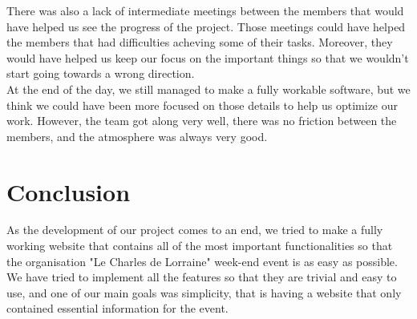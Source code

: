 \documentclass[a4paper, 12pt]{article}
\begin{document}
There was also a lack of intermediate meetings between the members that would have helped us see the progress of the project. Those meetings could have helped the members that had difficulties acheving some of their tasks. Moreover, they would have helped us keep our focus on the important things so that we wouldn't start going towards a wrong direction. \\

At the end of the day, we still managed to make a fully workable software, but we think we could have been more focused on those details to help us optimize our work. However, the team got along very well, there was no friction between the members, and the atmosphere was always very good.\\

\section{Conclusion}
As the development of our project comes to an end, we tried to make a fully working website that contains all of the most important functionalities so that the organisation "Le Charles de Lorraine" week-end event is as easy as possible. We have tried to implement all the features so that they are trivial and easy to use, and one of our main goals was simplicity, that is having a website that only contained essential information for the event. 
\end{document}
